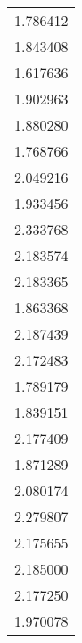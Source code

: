 \begin{longtable}[c]{l}
    1.786412 \\
    1.843408 \\
    1.617636 \\
    1.902963 \\
    1.880280 \\
    1.768766 \\
    2.049216 \\
    1.933456 \\
    2.333768 \\
    2.183574 \\
    2.183365 \\
    1.863368 \\
    2.187439 \\
    2.172483 \\
    1.789179 \\
    1.839151 \\
    2.177409 \\
    1.871289 \\
    2.080174 \\
    2.279807 \\
    2.175655 \\
    2.185000 \\
    2.177250 \\
    1.970078
\end{longtable}